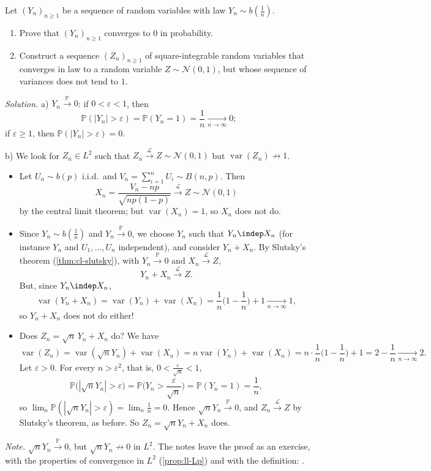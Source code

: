\begin{example}\label{exa:ct-variances}
Let $(Y_n)_{n\ge1}$ be a sequence of random variables with law $Y_n\sim b(\frac1n)$.
\begin{enumerate}[label=\alph*)]
  \item Prove that $(Y_n)_{n\ge1}$ converges to $0$ in probability.
  \item Construct a sequence $(Z_n)_{n\ge1}$ of square-integrable random variables that converges
    in law to a random variable $Z\sim\mathcal N(0,1)$, but whose sequence of variances does not
    tend to $1$.
\end{enumerate}

\emph{Solution.} a) $Y_n\xrightarrow{\mathbb P}0$: if $0<\varepsilon<1$, then
\[
  \mathbb P(|Y_n|>\varepsilon)=\mathbb P(Y_n=1)=\frac1n\xrightarrow[n\to\infty]{}0 ;
\]
if $\varepsilon\ge1$, then $\mathbb P(|Y_n|>\varepsilon)=0$.

b) We look for $Z_n\in L^2$ such that $Z_n\xrightarrow{\mathcal L}Z\sim\mathcal N(0,1)$ but
$\operatorname{var}(Z_n)\not\to1$.
\begin{itemize}
  \item Let $U_n\sim b(p)$ i.i.d.\ and $V_n=\sum_{i=1}^nU_i\sim B(n,p)$. Then
    \[
      X_n=\frac{V_n-np}{\sqrt{np(1-p)}}\xrightarrow{\mathcal L}Z\sim\mathcal N(0,1)
    \]
    by the central limit theorem; but $\operatorname{var}(X_n)=1$, so $X_n$ does not do.
  \item Since $Y_n\sim b(\frac1n)$ and $Y_n\xrightarrow{\mathbb P}0$, we choose $Y_n$ such that
    $Y_n\indep X_n$ (for instance $Y_n$ and $U_1,\dots,U_n$ independent), and consider $Y_n+X_n$.
    By Slutsky's theorem (\cref{thm:cl-slutsky}), with $Y_n\xrightarrow{\mathbb P}0$ and
    $X_n\xrightarrow{\mathcal L}Z$,
    \[
      Y_n+X_n\xrightarrow{\mathcal L}Z .
    \]
    But, since $Y_n\indep X_n$,
    \[
      \operatorname{var}(Y_n+X_n)=\operatorname{var}(Y_n)+\operatorname{var}(X_n)
      =\frac1n\Big(1-\frac1n\Big)+1\xrightarrow[n\to\infty]{}1 ,
    \]
    so $Y_n+X_n$ does not do either!
  \item Does $Z_n=\sqrt n\,Y_n+X_n$ do? We have
    \[
      \operatorname{var}(Z_n)=\operatorname{var}(\sqrt nY_n)+\operatorname{var}(X_n)=n\operatorname{var}(Y_n)+\operatorname{var}(X_n)
      =n\cdot\frac1n\Big(1-\frac1n\Big)+1=2-\frac1n\xrightarrow[n\to\infty]{}2 .
    \]
    Let $\varepsilon>0$. For every $n>\varepsilon^2$, that is, $0<\frac\varepsilon{\sqrt n}<1$,
    \[
      \mathbb P\big(|\sqrt nY_n|>\varepsilon\big)=\mathbb P\Big(Y_n>\frac\varepsilon{\sqrt n}\Big)
      =\mathbb P(Y_n=1)=\frac1n ,
    \]
    so $\lim_n\mathbb P(|\sqrt nY_n|>\varepsilon)=\lim_n\frac1n=0$. Hence
    $\sqrt nY_n\xrightarrow{\mathbb P}0$, and $Z_n\xrightarrow{\mathcal L}Z$ by Slutsky's theorem, as
    before. So $Z_n=\sqrt nY_n+X_n$ does.
\end{itemize}
\emph{Note.} $\sqrt nY_n\xrightarrow{\mathbb P}0$, but $\sqrt nY_n\not\to0$ in $L^2$. The notes leave
the proof as an exercise, with the properties of convergence in $L^2$ (\cref{prop:ll-Lp}) and with the
definition: .
\end{example}

